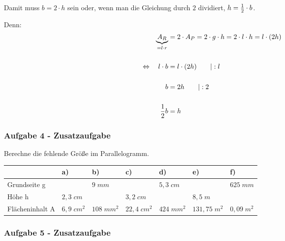 \documentclass[
  ngerman,
]{book}
\begin{document}
Damit muss \(b= 2 \cdot h\) sein oder, wenn man die Gleichung durch \(2\) dividiert, \(h={1 \over 2} \cdot b\).

Denn:
\[\begin{align} \underbrace{A_R}_{=l \cdot r} &= 2 \cdot A_{P}= 2 \cdot g \cdot h = 2 \cdot l \cdot h = l \cdot (2h)\\
{}\\
\Leftrightarrow \quad l \cdot b &= l \cdot (2h) \quad\quad |:l\\
                  {}\\
                 b &= 2h  \quad\quad |:2 \\
                 {}\\
                 {1 \over 2} b &= h \end{align}\]

\hypertarget{section-9}{%
\subsubsection*{}\label{section-9}}

\hypertarget{aufgabe-4---zusatzaufgabe}{%
\subsubsection*{\texorpdfstring{Aufgabe 4 - \textbf{Zusatzaufgabe}}{Aufgabe 4 - Zusatzaufgabe}}\label{aufgabe-4---zusatzaufgabe}}

Berechne die fehlende Größe im Parallelogramm.

\begin{longtable}[]{@{}lllllll@{}}
\toprule
& a) & b) & c) & d) & e) & f)\tabularnewline
\midrule
\endhead
Grundseite g & & \(9\;mm\) & & \(5,3\;cm\) & & \(625\;mm\)\tabularnewline
Höhe h & \(2,3\;cm\) & & \(3,2\;cm\) & & \(8,5\;m\) &\tabularnewline
Flächeninhalt A & \(6,9\;cm^2\) & \(108\;mm^2\) & \(22,4\;cm^2\) & \(424\;mm^2\) & \(131,75\;m^2\) & \(0,09\;m^2\)\tabularnewline
\bottomrule
\end{longtable}

\hypertarget{aufgabe-5---zusatzaufgabe-1}{%
\subsubsection*{\texorpdfstring{Aufgabe 5 - \textbf{Zusatzaufgabe}}{Aufgabe 5 - Zusatzaufgabe}}\label{aufgabe-5---zusatzaufgabe-1}}
\end{document}
